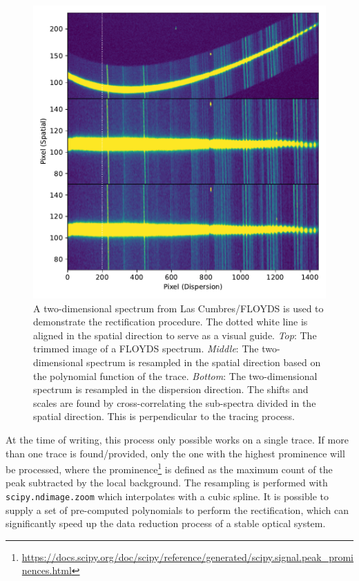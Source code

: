 \documentclass[linenumbers, twocolumn]{aastex631}
\begin{document}
\begin{figure}
    \centering
    \includegraphics[width=\columnwidth]{fig_02_rectification.pdf}
    \caption{A two-dimensional spectrum from Las Cumbres/FLOYDS is used to demonstrate
    the rectification procedure. The dotted white line is aligned in the
    spatial direction to serve as a visual guide. \textit{Top}: The trimmed image of a
    FLOYDS spectrum. \textit{Middle}: The two-dimensional spectrum is resampled in the
    spatial direction based on the polynomial function of the trace. \textit{Bottom}:
    The two-dimensional spectrum is resampled in the dispersion direction. The
    shifts and scales are found by cross-correlating the sub-spectra divided in
    the spatial direction. This is perpendicular to the tracing process.}
    \label{fig:rectify}
\end{figure}

At the time of writing, this process only possible works on a single trace. If
more than one trace is found/provided, only the one with the highest prominence
will be processed, where the 
prominence\footnote{\url{https://docs.scipy.org/doc/scipy/reference/generated/scipy.signal.peak_prominences.html}}
is defined as the maximum count of the peak subtracted by the local background. 
The resampling is performed with \texttt{scipy.ndimage.zoom} 
which interpolates with a cubic spline. It is possible to supply a set of
pre-computed polynomials to perform the rectification, which can significantly
speed up the data reduction process of a stable optical system.
\end{document}
